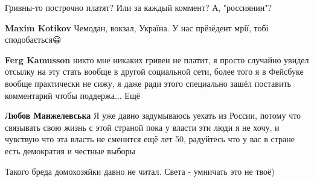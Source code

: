 \begin{itemize}
\begin{itemize}
 
Гривны-то построчно платят? Или за каждый коммент? А, "россиянин"?

 
\textbf{Maxim Kotikov} Чемодан, вокзал, Україна. У нас прёзёдент мрії, тобі сподобається😀

 
\textbf{Ferg Kamusson} никто мне никаких гривен не платит, я просто случайно увидел отсылку на эту стать вообще в другой социальной сети, более того я в Фейсбуке вообще практически не сижу, я даже ради этого специально зашёл поставить комментарий чтобы поддержа... Ещё

 
\textbf{Любов Манжелевська} Я уже давно задумываюсь уехать из России, потому что связывать свою жизнь с этой страной пока у власти эти люди я не хочу, и чувствую что эта власть не сменится ещё лет 50, радуйтесь что у вас в стране есть демократия и честные выборы

\end{itemize}

 
Такого бреда домохозяйки давно не читал. Света - умничать это не твоё)

 

\end{itemize}

